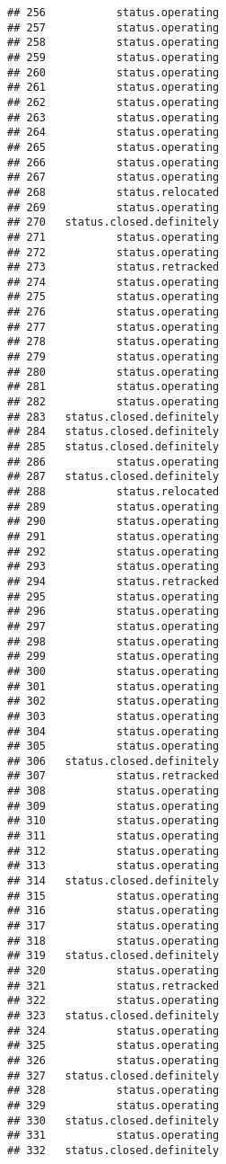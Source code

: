 \documentclass[
]{article}
\begin{document}
\begin{verbatim}
## 256           status.operating
## 257           status.operating
## 258           status.operating
## 259           status.operating
## 260           status.operating
## 261           status.operating
## 262           status.operating
## 263           status.operating
## 264           status.operating
## 265           status.operating
## 266           status.operating
## 267           status.operating
## 268           status.relocated
## 269           status.operating
## 270   status.closed.definitely
## 271           status.operating
## 272           status.operating
## 273           status.retracked
## 274           status.operating
## 275           status.operating
## 276           status.operating
## 277           status.operating
## 278           status.operating
## 279           status.operating
## 280           status.operating
## 281           status.operating
## 282           status.operating
## 283   status.closed.definitely
## 284   status.closed.definitely
## 285   status.closed.definitely
## 286           status.operating
## 287   status.closed.definitely
## 288           status.relocated
## 289           status.operating
## 290           status.operating
## 291           status.operating
## 292           status.operating
## 293           status.operating
## 294           status.retracked
## 295           status.operating
## 296           status.operating
## 297           status.operating
## 298           status.operating
## 299           status.operating
## 300           status.operating
## 301           status.operating
## 302           status.operating
## 303           status.operating
## 304           status.operating
## 305           status.operating
## 306   status.closed.definitely
## 307           status.retracked
## 308           status.operating
## 309           status.operating
## 310           status.operating
## 311           status.operating
## 312           status.operating
## 313           status.operating
## 314   status.closed.definitely
## 315           status.operating
## 316           status.operating
## 317           status.operating
## 318           status.operating
## 319   status.closed.definitely
## 320           status.operating
## 321           status.retracked
## 322           status.operating
## 323   status.closed.definitely
## 324           status.operating
## 325           status.operating
## 326           status.operating
## 327   status.closed.definitely
## 328           status.operating
## 329           status.operating
## 330   status.closed.definitely
## 331           status.operating
## 332   status.closed.definitely

\end{verbatim}
\end{document}
